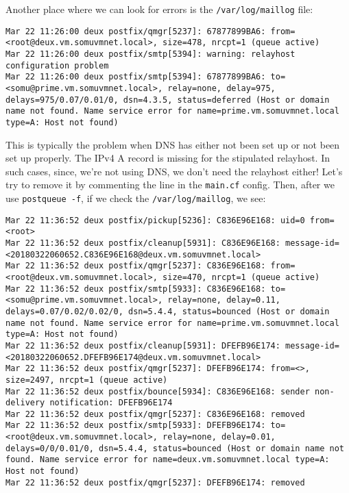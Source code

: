 Another place where we can look for errors is the \verb|/var/log/maillog| file:

\vspace{-15pt}
\begin{verbatim}
Mar 22 11:26:00 deux postfix/qmgr[5237]: 67877899BA6: from=<root@deux.vm.somuvmnet.local>, size=478, nrcpt=1 (queue active)
Mar 22 11:26:00 deux postfix/smtp[5394]: warning: relayhost configuration problem
Mar 22 11:26:00 deux postfix/smtp[5394]: 67877899BA6: to=<somu@prime.vm.somuvmnet.local>, relay=none, delay=975, delays=975/0.07/0.01/0, dsn=4.3.5, status=deferred (Host or domain name not found. Name service error for name=prime.vm.somuvmnet.local type=A: Host not found)
\end{verbatim}
\vspace{-10pt}	

\noindent
This is typically the problem when DNS has either not been set up or not been set up properly. The IPv4 A record is missing for the stipulated relayhost. In such cases, since, we're not using DNS, we don't need the relayhost either! Let's try to remove it by commenting the line in the \verb|main.cf| config. Then, after we use \verb|postqueue -f|, if we check the \verb|/var/log/maillog|, we see: 

\vspace{-15pt}
\begin{verbatim}
Mar 22 11:36:52 deux postfix/pickup[5236]: C836E96E168: uid=0 from=<root>
Mar 22 11:36:52 deux postfix/cleanup[5931]: C836E96E168: message-id=<20180322060652.C836E96E168@deux.vm.somuvmnet.local>
Mar 22 11:36:52 deux postfix/qmgr[5237]: C836E96E168: from=<root@deux.vm.somuvmnet.local>, size=470, nrcpt=1 (queue active)
Mar 22 11:36:52 deux postfix/smtp[5933]: C836E96E168: to=<somu@prime.vm.somuvmnet.local>, relay=none, delay=0.11, delays=0.07/0.02/0.02/0, dsn=5.4.4, status=bounced (Host or domain name not found. Name service error for name=prime.vm.somuvmnet.local type=A: Host not found)
Mar 22 11:36:52 deux postfix/cleanup[5931]: DFEFB96E174: message-id=<20180322060652.DFEFB96E174@deux.vm.somuvmnet.local>
Mar 22 11:36:52 deux postfix/qmgr[5237]: DFEFB96E174: from=<>, size=2497, nrcpt=1 (queue active)
Mar 22 11:36:52 deux postfix/bounce[5934]: C836E96E168: sender non-delivery notification: DFEFB96E174
Mar 22 11:36:52 deux postfix/qmgr[5237]: C836E96E168: removed
Mar 22 11:36:52 deux postfix/smtp[5933]: DFEFB96E174: to=<root@deux.vm.somuvmnet.local>, relay=none, delay=0.01, delays=0/0/0.01/0, dsn=5.4.4, status=bounced (Host or domain name not found. Name service error for name=deux.vm.somuvmnet.local type=A: Host not found)
Mar 22 11:36:52 deux postfix/qmgr[5237]: DFEFB96E174: removed
\end{verbatim}
\vspace{-10pt}	

